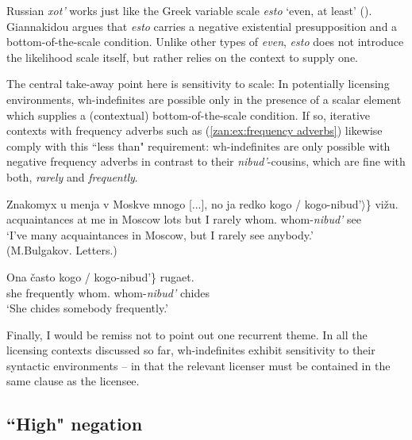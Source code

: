 \documentclass[output=paper,colorlinks,citecolor=brown]{langscibook}
\begin{document}
\noindent Russian \textit{xot'} works just like the Greek variable scale \textit{esto} `even, at least' (\citealt{giannakidou2007landscape}). Giannakidou argues that \textit{esto} carries a negative existential presupposition and a bottom-of-the-scale condition. Unlike other types of \textit{even}, \textit{esto} does not introduce the likelihood scale itself, but rather relies on the context to supply one.

The central take-away point here is sensitivity to scale: In potentially licensing environments, wh-indefinites are possible only in the presence of a scalar element which supplies a (contextual) bottom-of-the-scale condition. If so, iterative contexts with frequency adverbs such as (\ref{zan:ex:frequency adverbs}) likewise comply with this ``less than" requirement: wh-indefinites are only possible with negative frequency adverbs in contrast to their \textit{nibud'}-cousins, which are fine with both, \textit{rarely} and \textit{frequently}.    

\ea \label{zan:ex:frequency adverbs}
\ea  \label{zan:ex:neg frequency adverbs}
 \gll Znakomyx u menja v Moskve mnogo [...], no ja redko\hspace{1.4cm} \minsp{\{} kogo / \minsp{$\langle$}  kogo-nibud'$\rangle$\} vižu.\\
      acquaintances at me in Moscow lots {} but I rarely {} whom.{\INDF} {} {} {} whom-\textit{nibud'} see \\
        \glt `I've many acquaintances in Moscow, but I rarely see anybody.’\\ \hfill (M.Bulgakov. Letters.)
        
\ex  \label{zan:ex:pos frequency adverbs}
        \gll Ona často \minsp{\{*} kogo /   kogo-nibud'\} rugaet.  \\
       she frequently {} whom.{\INDF} {} {} whom-\textit{nibud'} chides \\
        \glt `She chides somebody frequently.'
\z
\z

\noindent Finally, I would be remiss not to point out one recurrent theme. In all the licensing contexts discussed so far, wh-indefinites exhibit sensitivity to their syntactic environments -- in that the relevant licenser must be contained in the same clause as the licensee.   


\subsection{``High" negation}\label{zan:subsec:high negation}
\end{document}
